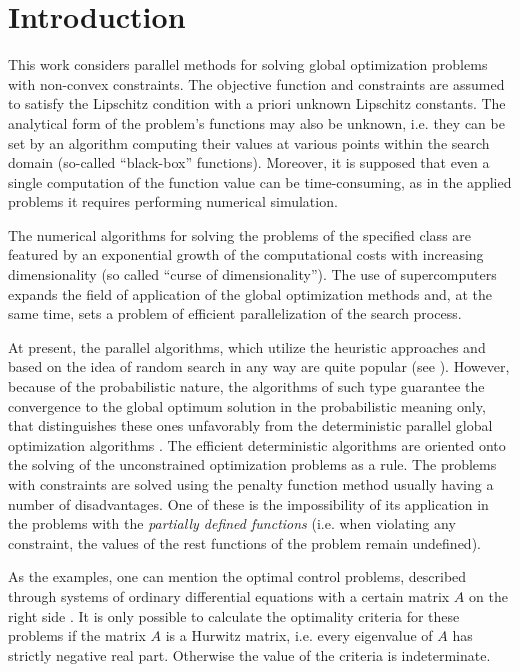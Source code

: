 \documentclass[smallextended]{svjour3}       %
\begin{document}
\section{Introduction}
\label{intro}

This work considers parallel methods for solving global optimization problems with non-convex constraints. The objective function and constraints are assumed to satisfy the Lipschitz condition with a priori unknown Lipschitz constants. The analytical form of the problem’s functions may also be unknown, i.e. they can be set by an algorithm computing their values at various points within the search domain (so-called ``black-box'' functions). Moreover, it is supposed that even a single computation of the function value can be time-consuming, as in the applied problems it requires performing numerical simulation. 

The numerical algorithms for solving the problems of the specified class are featured by an exponential growth of the computational costs with increasing dimensionality (so called ``curse of dimensionality''). The use of supercomputers expands the field of application of the global optimization methods and, at the same time, sets a problem of efficient parallelization of the search process.

At present, the parallel algorithms, which utilize the heuristic approaches and based on the idea of random search in any way are quite popular (see \cite{RefFerreiro,RefZhu,Korosec,Guerrero}). However, because of the probabilistic nature, the algorithms of such type guarantee the convergence to the global optimum solution in the probabilistic meaning only, that distinguishes these ones unfavorably from the deterministic parallel global optimization algorithms \cite{Jones2001,Paulavicius2011,Evtushenko2013}. The efficient deterministic algorithms are oriented onto the solving of the unconstrained optimization problems as a rule. The problems with constraints are solved using the penalty function method usually having a number of disadvantages. One of these is the impossibility of its application in the problems with the \textit{partially defined functions} (i.e. when violating any constraint, the values of the rest functions of the problem remain undefined).

As the examples, one can mention the optimal control problems, described through systems of ordinary differential equations with a certain matrix $A$ on the right side \cite{Balandin2011,Balandin2017}. It is only possible to calculate the optimality criteria for these problems if the matrix $A$ is a Hurwitz matrix, i.e. every eigenvalue of $A$ has strictly negative real part. Otherwise the value of the criteria is indeterminate.
\end{document}
